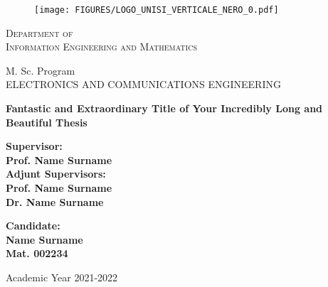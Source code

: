 \begin{titlepage}
%
\begin{figure}[ht]
\centering
\texttt{[image: FIGURES/LOGO\_UNISI\_VERTICALE\_NERO\_0.pdf]}
\end{figure}
%
\begin{center}
{\scshape \Large
Department of\\Information Engineering and Mathematics
}

\vspace{5mm}


{\large 
M. Sc. Program \\ 
{ ELECTRONICS AND COMMUNICATIONS ENGINEERING}
}

\vspace{22mm}

{\huge \bf Fantastic and Extraordinary Title of Your Incredibly Long and Beautiful Thesis}

\end{center}

\vspace{8mm}
\noindent
\begin{minipage}[t]{0.5\textwidth}
\bf Supervisor:\\
Prof. Name Surname\\
 
Adjunt Supervisors:\\
Prof. Name Surname\\
Dr. Name Surname\\
\end{minipage}
\hfill
\begin{minipage}[t]{0.5\textwidth}\raggedleft
\bf Candidate:\\
Name Surname\\
Mat. 002234
\end{minipage}

\vfill

\begin{center}
\large Academic Year 2021-2022
\end{center}



\end{titlepage}
\restoregeometry
